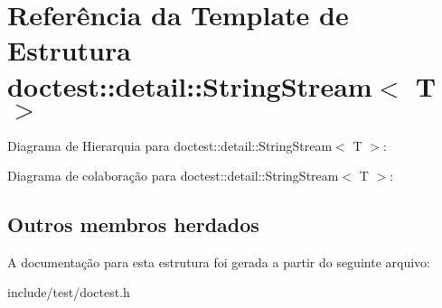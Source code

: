\hypertarget{structdoctest_1_1detail_1_1StringStream}{}\section{Referência da Template de Estrutura doctest\+:\+:detail\+:\+:String\+Stream$<$ T $>$}
\label{structdoctest_1_1detail_1_1StringStream}


Diagrama de Hierarquia para doctest\+:\+:detail\+:\+:String\+Stream$<$ T $>$\+:


Diagrama de colaboração para doctest\+:\+:detail\+:\+:String\+Stream$<$ T $>$\+:
\subsection*{Outros membros herdados}


A documentação para esta estrutura foi gerada a partir do seguinte arquivo\+:\begin{DoxyCompactItemize}
\item 
include/test/doctest.\+h\end{DoxyCompactItemize}

